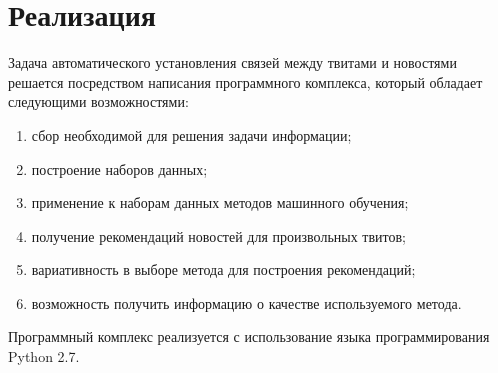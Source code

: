 \section{Реализация}
    Задача автоматического установления связей между твитами и новостями решается посредством написания программного комплекса,
    который обладает следующими возможностями:
    \begin{enumerate}
        \item сбор необходимой для решения задачи информации;
        \item построение наборов данных;
        \item применение к наборам данных методов машинного обучения;
        \item получение рекомендаций новостей для произвольных твитов;
        \item вариативность в выборе метода для построения рекомендаций;
        \item возможность получить информацию о качестве используемого метода.
    \end{enumerate}

    Программный комплекс реализуется с использование языка программирования Python 2.7.

    
    
    
    
    
    
    

